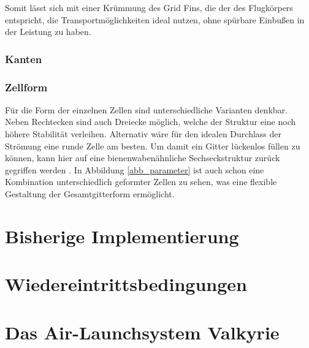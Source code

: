 Somit lässt sich mit einer Krümmung des Grid Fins, die der des Flugkörpers entspricht, die Transportmöglichkeiten ideal nutzen, ohne spürbare Einbußen in der Leistung zu haben.
\subsubsection{Kanten}

\subsubsection{Zellform}
Für die Form der einzelnen Zellen sind unterschiedliche Varianten denkbar. Neben Rechtecken sind auch Dreiecke möglich, welche der Struktur eine noch höhere Stabilität verleihen. Alternativ wäre für den idealen Durchlass der Strömung eine runde Zelle am besten. Um damit ein Gitter lückenlos füllen zu können, kann hier auf eine bienenwabenähnliche Sechseckstruktur zurück gegriffen werden \cite{Pattern}. In Abbildung \ref{abb_parameter} ist auch schon eine Kombination unterschiedlich geformter Zellen zu sehen, was eine flexible Gestaltung der Gesamtgitterform ermöglicht.\\


\section{Bisherige Implementierung}


\section{Wiedereintrittsbedingungen}


\section{Das Air-Launchsystem Valkyrie}

